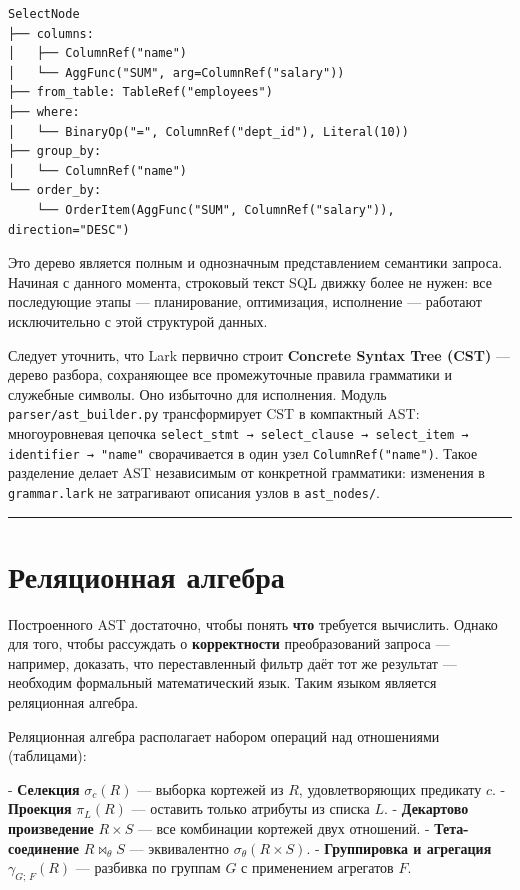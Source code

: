 \documentclass[a4paper,12pt]{report}
\begin{document}
{\begin{verbatim}
SelectNode
├── columns:
│   ├── ColumnRef("name")
│   └── AggFunc("SUM", arg=ColumnRef("salary"))
├── from_table: TableRef("employees")
├── where:
│   └── BinaryOp("=", ColumnRef("dept_id"), Literal(10))
├── group_by:
│   └── ColumnRef("name")
└── order_by:
    └── OrderItem(AggFunc("SUM", ColumnRef("salary")), direction="DESC")
\end{verbatim}

Это дерево является полным и однозначным представлением семантики запроса. Начиная с данного момента, строковый текст SQL движку более не нужен: все последующие этапы — планирование, оптимизация, исполнение — работают исключительно с этой структурой данных.

Следует уточнить, что Lark первично строит \textbf{Concrete Syntax Tree (CST)} — дерево разбора, сохраняющее все промежуточные правила грамматики и служебные символы. Оно избыточно для исполнения. Модуль \texttt{parser/ast\_builder.py} трансформирует CST в компактный AST: многоуровневая цепочка \texttt{select\_stmt → select\_clause → select\_item → identifier → "name"} сворачивается в один узел \texttt{ColumnRef("name")}. Такое разделение делает AST независимым от конкретной грамматики: изменения в \texttt{grammar.lark} не затрагивают описания узлов в \texttt{ast\_nodes/}.

\vspace{0.5cm}\hrule\vspace{0.5cm}

\section{Реляционная алгебра}

Построенного AST достаточно, чтобы понять \textbf{что} требуется вычислить. Однако для того, чтобы рассуждать о \textbf{корректности} преобразований запроса — например, доказать, что переставленный фильтр даёт тот же результат — необходим формальный математический язык. Таким языком является реляционная алгебра.

Реляционная алгебра располагает набором операций над отношениями (таблицами):

- \textbf{Селекция} $\sigma_{c}(R)$ — выборка кортежей из $R$, удовлетворяющих предикату $c$.
- \textbf{Проекция} $\pi_{L}(R)$ — оставить только атрибуты из списка $L$.
- \textbf{Декартово произведение} $R \times S$ — все комбинации кортежей двух отношений.
- \textbf{Тета-соединение} $R \bowtie_{\theta} S$ — эквивалентно $\sigma_{\theta}(R \times S)$.
- \textbf{Группировка и агрегация} $\gamma_{G;\, F}(R)$ — разбивка по группам $G$ с применением агрегатов $F$.

}
\end{document}
